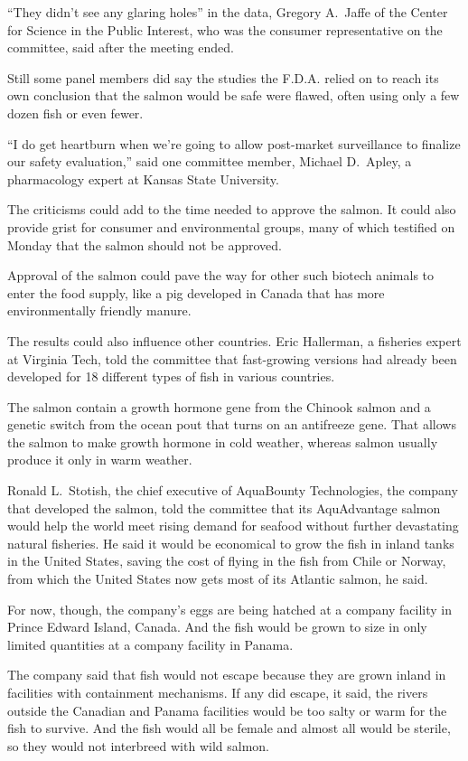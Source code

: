 ﻿\documentclass[12pt]{article}
\begin{document}
``They didn't see any glaring holes'' in the data, Gregory A.~Jaffe of the Center for Science in the
Public Interest, who was the consumer representative on the committee, said after the meeting ended.

Still some panel members did say the studies the F.D.A. relied on to reach its own conclusion that
the salmon would be safe were flawed, often using only a few dozen fish or even fewer.

``I do get heartburn when we're going to allow post-market surveillance to finalize our safety
evaluation,'' said one committee member, Michael D.~Apley, a pharmacology expert at Kansas State
University.

The criticisms could add to the time needed to approve the salmon. It could also provide grist for
consumer and environmental groups, many of which testified on Monday that the salmon should not be
approved.

Approval of the salmon could pave the way for other such biotech animals to enter the food supply,
like a pig developed in Canada that has more environmentally friendly manure.

The results could also influence other countries. Eric Hallerman, a fisheries expert at Virginia
Tech, told the committee that fast-growing versions had already been developed for 18 different
types of fish in various countries.

The salmon contain a growth hormone gene from the Chinook salmon and a genetic switch from the ocean
pout that turns on an antifreeze gene. That allows the salmon to make growth hormone in cold
weather, whereas salmon usually produce it only in warm weather.

Ronald L.~Stotish, the chief executive of AquaBounty Technologies, the company that developed the
salmon, told the committee that its AquAdvantage salmon would help the world meet rising demand for
seafood without further devastating natural fisheries. He said it would be economical to grow the
fish in inland tanks in the United States, saving the cost of flying in the fish from Chile or
Norway, from which the United States now gets most of its Atlantic salmon, he said.

For now, though, the company's eggs are being hatched at a company facility in Prince Edward Island,
Canada. And the fish would be grown to size in only limited quantities at a company facility in
Panama.

The company said that fish would not escape because they are grown inland in facilities with
containment mechanisms. If any did escape, it said, the rivers outside the Canadian and Panama
facilities would be too salty or warm for the fish to survive. And the fish would all be female and
almost all would be sterile, so they would not interbreed with wild salmon.
\end{document}

